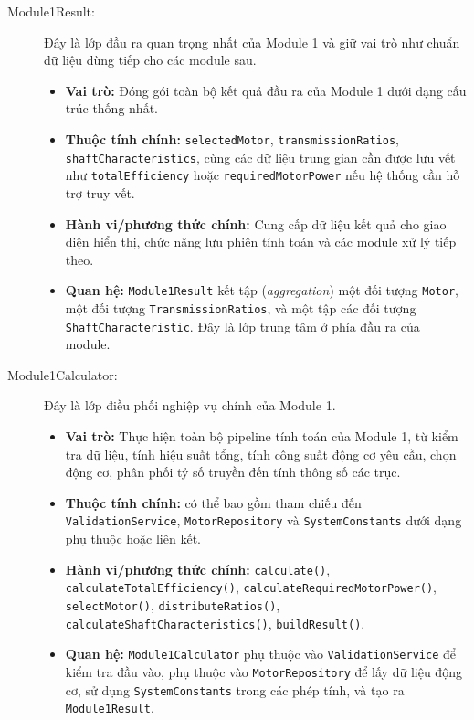 \documentclass[a4paper]{article}
\begin{document}
\begin{description}
    \item[Module1Result:]
    Đây là lớp đầu ra quan trọng nhất của Module 1 và giữ vai trò như chuẩn dữ liệu dùng tiếp cho các module sau.
    \begin{itemize}
        \item \textbf{Vai trò:} Đóng gói toàn bộ kết quả đầu ra của Module 1 dưới dạng cấu trúc thống nhất.
        \item \textbf{Thuộc tính chính:} \texttt{selectedMotor}, \texttt{transmissionRatios}, \texttt{shaftCharacteristics}, cùng các dữ liệu trung gian cần được lưu vết như \texttt{totalEfficiency} hoặc \texttt{requiredMotorPower} nếu hệ thống cần hỗ trợ truy vết.
        \item \textbf{Hành vi/phương thức chính:} Cung cấp dữ liệu kết quả cho giao diện hiển thị, chức năng lưu phiên tính toán và các module xử lý tiếp theo.
        \item \textbf{Quan hệ:} \texttt{Module1Result} kết tập (\textit{aggregation}) một đối tượng \texttt{Motor}, một đối tượng \texttt{TransmissionRatios}, và một tập các đối tượng \texttt{ShaftCharacteristic}. Đây là lớp trung tâm ở phía đầu ra của module.
    \end{itemize}

    \item[Module1Calculator:]
    Đây là lớp điều phối nghiệp vụ chính của Module 1.
    \begin{itemize}
        \item \textbf{Vai trò:} Thực hiện toàn bộ pipeline tính toán của Module 1, từ kiểm tra dữ liệu, tính hiệu suất tổng, tính công suất động cơ yêu cầu, chọn động cơ, phân phối tỷ số truyền đến tính thông số các trục.
        \item \textbf{Thuộc tính chính:} có thể bao gồm tham chiếu đến \texttt{ValidationService}, \texttt{MotorRepository} và \texttt{SystemConstants} dưới dạng phụ thuộc hoặc liên kết.
        \item \textbf{Hành vi/phương thức chính:} \texttt{calculate()}, \texttt{calculateTotalEfficiency()}, \texttt{calculateRequiredMotorPower()}, \texttt{selectMotor()}, \texttt{distributeRatios()}, \texttt{calculateShaftCharacteristics()}, \texttt{buildResult()}.
        \item \textbf{Quan hệ:} \texttt{Module1Calculator} phụ thuộc vào \texttt{ValidationService} để kiểm tra đầu vào, phụ thuộc vào \texttt{MotorRepository} để lấy dữ liệu động cơ, sử dụng \texttt{SystemConstants} trong các phép tính, và tạo ra \texttt{Module1Result}.
    \end{itemize}


\end{description}
\end{document}
